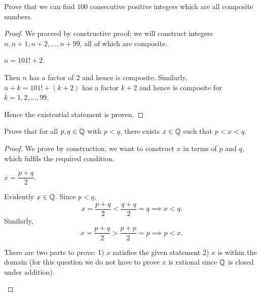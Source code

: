 \begin{example}
Prove that we can find $100$ consecutive positive integers which are all composite numbers.

\begin{proof}
We proceed by constructive proof; we will construct integers $n,n+1,n+2,\dots,n+99$, all of which are composite.
\begin{claim}
$n=101!+2$.
\end{claim}
Then $n$ has a factor of $2$ and hence is composite. Similarly, $n+k=101!+(k+2)$ has a factor $k+2$ and hence is composite for $k=1,2,\dots,99$.

Hence the existential statement is proven.
\end{proof}
\end{example}

\begin{example}
Prove that for all $p,q\in\mathbb Q$ with $p<q$, there exists $x\in\mathbb Q$ such that $p<x<q$.
\begin{proof}
We prove by construction; we want to construct $x$ in terms of $p$ and $q$, which fulfils the required condition.
\begin{claim}
$x=\dfrac{p+q}{2}$.
\end{claim}
Evidently $x\in\mathbb Q$. Since $p<q$, 
\[x=\frac{p+q}{2}<\frac{q+q}{2}=q \implies x<q.\]
Similarly,
\[x=\frac{p+q}{2}>\frac{p+p}{2}=p \implies p<x.\]

\begin{remark}
There are two parts to prove: 1) $x$ satisfies the given statement 2) $x$ is within the domain (for this question we do not have to prove $x$ is rational since $\mathbb Q$ is closed under addition).
\end{remark}
\end{proof}
\end{example}

